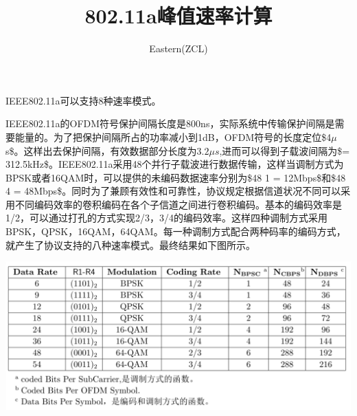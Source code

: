 \documentclass[10pt,a4paper,UTF8]{article}
\author{Eastern(ZCL)}
\date{}
\title{802.11a峰值速率计算}
\begin{document}
\maketitle
\tableofcontents
{}
IEEE802.11a可以支持8种速率模式。

IEEE802.11a的OFDM符号保护间隔长度是800ns，实际系统中传输保护间隔是需要能量的。为了把保护间隔所占的功率减小到1dB，OFDM符号的长度定位\$4\(\mu\) s\$。这样出去保护间隔，有效数据部分长度为\(3.2\mu s\),进而可以得到子载波间隔为\$= 312.5kHz\$。IEEE802.11a采用48个并行子载波进行数据传输，这样当调制方式为BPSK或者16QAM时，可以提供的未编码数据速率分别为\$48\texttimes{} 1\texttimes{} = 12Mbps\$和\$48\texttimes{} 4\texttimes{} = 48Mbps\$。同时为了兼顾有效性和可靠性，协议规定根据信道状况不同可以采用不同编码效率的卷积编码在各个子信道之间进行卷积编码。基本的编码效率是1/2，可以通过打孔的方式实现2/3，3/4的编码效率。这样四种调制方式采用BPSK，QPSK，16QAM，64QAM。每一种调制方式配合两种码率的编码方式，就产生了协议支持的八种速率模式。最终结果如下图所示。

\begin{center}
\includegraphics[width=.9\linewidth]{../../img/communication_protocol/20171018wifiPeakRate.png}
\end{center}
\end{document}
